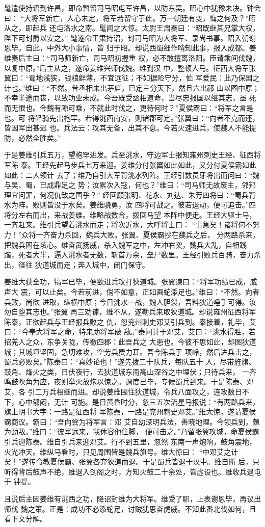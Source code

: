 髦遣使持诏到许昌，即命暂留司马昭屯军许昌，以防东吴。昭心中犹豫未决。钟会曰：
“大将军新亡，人心未定，将军若留守于此。万一朝廷有变，悔之何及？”昭从之，即起兵
还屯洛水之南。髦闻之大惊。太尉王肃奏曰：“昭既继其兄掌大权，陛下可封爵以安之。”
髦遂命王肃持诏，封司马昭为大将军、录尚书事。昭入朝谢恩毕。自此，中外大小事情，皆
归于昭。却说西蜀细作哨知此事，报入成都。姜维奏后主曰：“司马师新亡，司马昭初握重
权，必不敢擅离洛阳。臣请乘间伐魏，以复中原。”后主从之，遂命姜维兴师伐魏。维到汉
中，整顿人马。征西大将军张翼曰：“蜀地浅狭，钱粮鲜薄，不宜远征；不如据险守分，恤
军爱民：此乃保国之计也。”维曰：“不然。昔丞相未出茅庐，已定三分天下，然且六出祁
山以图中原；不幸半途而丧，以致功业未成。今吾既受丞相遗命，当尽忠报国以继其志，虽
死而无恨也。今魏有隙可乘，不就此时伐之，更待何时？”夏侯霸曰：“将军之言是也。可
将轻骑先出枹罕。若得洮西南安，则诸郡可定。”张翼曰：“向者不克而还，皆因军出甚迟
也。兵法云：攻其无备，出其不意。今若火速进兵，使魏人不能提防，必然全胜矣。”

于是姜维引兵五万，望枹罕进发。兵至洮水，守边军士报知雍州刺史王经、征西将军陈
泰。王经先起马步兵七万来迎。姜维分付张翼如此如此，又分付夏侯霸如此如此：二人领计
去了；维乃自引大军背洮水列阵。王经引数员牙将出而问曰：“魏与吴、蜀，已成鼎足之
势；汝累次入寇，何也？”维曰：“司马师无故废主，邻邦理宜问罪，何况仇敌之国乎？”
经回顾张明、花永、刘达、朱芳四将曰：“蜀兵背水为阵。败则皆没于水矣。姜维骁勇，汝
四将可战之。彼若退动，便可追击。”四将分左右而出，来战姜维。维略战数合，拨回马望
本阵中便走。王经大驱士马，一齐赶来。维引兵望着洮水而走；将次近水，大呼将士曰：
“事急矣！诸将何不努力！”众将一齐奋力杀回，魏兵大败。张翼、夏侯霸抄在魏兵之后，
分两路杀来，把魏兵困在垓心。维奋武扬威，杀入魏军之中，左冲右突，魏兵大乱，自相践
踏，死者大半，逼入洮水者无数，斩首万余，垒尸数里。王经引败兵百骑，奋力杀出，径往
狄道城而走；奔入城中，闭门保守。

姜维大获全功，犒军已毕，便欲进兵攻打狄道城。张翼谏曰：“将军功绩已成，威声大
震，可以止矣。今若前进，倘不如意，正如画蛇添足也。”维曰：“不然。向者兵败，尚欲
进取，纵横中原；今日洮水一战，魏人胆裂，吾料狄道唾手可得。汝勿自堕其志也。”张翼
再三劝谏，维不从，遂勒兵来取狄道城。却说雍州征西将军陈泰，正欲起兵与王经报兵败之
仇，忽兖州刺史邓艾引兵到。泰接着，礼毕，艾曰：“今奉大将军之命，特来助将军破
敌。”泰问计于邓艾，艾曰：“洮水得胜，若招羌人之众，东争关陇，传檄四郡：此吾兵之
大患也。今彼不思如此，却图狄道城；其城垣坚固，急切难攻，空劳兵费力耳。吾今陈兵于
项岭，然后进兵击之，蜀兵必败矣。”陈泰曰：“真妙论也！”遂先拨二十队兵，每队五十
人，尽带旌旗、鼓角、烽火之类，日伏夜行，去狄道城东南高山深谷之中埋伏；只待兵来，
一齐鸣鼓吹角为应，夜则举火放炮以惊之。调度已毕，专候蜀兵到来。于是陈泰、邓艾，各
引二万兵相继而进。却说姜维围住狄道城，令兵八面攻之，连攻数日不下，心中郁闷，无计
可施。是日黄昏时分，忽三五次流星马报说：“有两路兵来，旗上明书大字：一路是征西将
军陈泰，一路是兖州刺史邓艾。”维大惊，遂请夏侯霸商议。霸曰：“吾向尝为将军言：邓
艾自幼深明兵法，善晓地理。今领兵到，颇为劲敌。”维曰：“彼军远来，我休容他住脚，
便可击之。”乃留张翼攻城，命夏侯霸引兵迎陈泰。维自引兵来迎邓艾。行不到五里，忽然
东南一声炮响，鼓角震地，火光冲天。维纵马看时，只见周围皆是魏兵旗号。维大惊曰：
“中邓艾之计矣！”遂传令教夏侯霸、张翼各弃狄道而退。于是蜀兵皆退于汉中。维自断
后，只听得背后鼓声不绝，维退入剑阁之时，方知火鼓二十余处，皆虚设也。维收兵退屯于
钟提。

且说后主因姜维有洮西之功，降诏封维为大将军。维受了职，上表谢恩毕，再议出师伐
魏之策。正是：成功不必添蛇足，讨贼犹思奋虎威。不知此番北伐如何，且看下文分解。